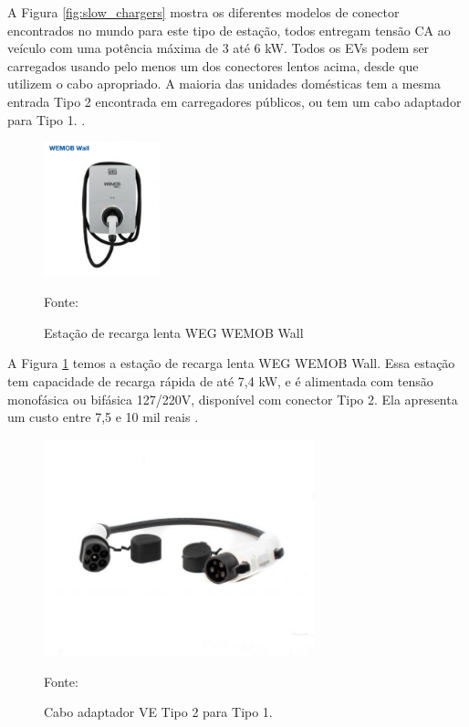 A Figura \ref{fig:slow_chargers} mostra os diferentes modelos de conector encontrados no mundo para este tipo de estação, todos entregam tensão CA ao veículo com uma potência máxima de 3 até 6 kW. Todos os EVs podem ser carregados usando pelo menos um dos conectores lentos acima, desde que utilizem o cabo apropriado. A maioria das unidades domésticas tem a mesma entrada Tipo 2 encontrada em carregadores públicos, ou tem um cabo adaptador para Tipo 1. \cite{ev_conect_zap}.

\begin{figure}[H]
    \centering
    \includegraphics[width=0.3\textwidth]{./Figuras/estacao_lenta.png}
    \caption{Estação de recarga lenta WEG WEMOB Wall}{Fonte: \cite{weg_estacao}}
   \label{fig:estacao_lenta}
\end{figure}

A Figura \ref{fig:estacao_lenta} temos a estação de recarga lenta WEG WEMOB Wall. Essa estação tem capacidade de recarga rápida de até 7,4 kW, e é alimentada com tensão monofásica ou bifásica 127/220V, disponível com conector Tipo 2. Ela apresenta um custo entre 7,5 e 10 mil reais \cite{weg_estacao}.

\begin{figure}[H]
    \centering
    \includegraphics[width=0.7\textwidth]{./Figuras/tipe_2_to_1.jpg}
    \caption{Cabo adaptador VE Tipo 2 para Tipo 1.}{Fonte: \cite{EVSE}}
   \label{fig:tipe_2_to_1}
\end{figure}


